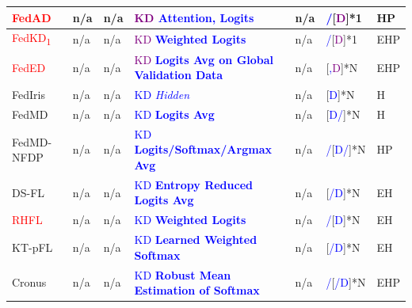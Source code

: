 \begin{table}[htp]
\begin{longtable}{|p{1.68cm}|p{1.2cm}|p{1.25cm}|p{5.0cm}|p{2.59cm}|p{1.2cm}|p{0.35cm}|}
    \rowcolor[gray]{.9}
    \textcolor{red}{FedAD}~\cite{gong2021ensemble} & n/a & n/a & \textcolor{purple}{KD} \textcolor{blue}{\textbf{Attention, Logits}}  & n/a & \textcolor{blue}{/}[\textcolor{purple}{D}]*1 & HP \\ \hline %
  
    \textcolor{red}{FedKD\textsubscript{1}}~\cite{gong2022preserving} & n/a & n/a & \textcolor{purple}{KD} \textcolor{blue}{\textbf{Weighted Logits}} & n/a &\textcolor{blue}{/}[\textcolor{purple}{D}]*1 & EHP \\ \hline %

    \rowcolor[gray]{.9}
    \textcolor{red}{FedED}~\cite{sui2020feded} & n/a & n/a & \textcolor{purple}{KD} \textcolor{blue}{\textbf{Logits Avg on Global Validation Data}} & n/a &[\textcolor{blue}{,}\textcolor{purple}{D}]*N & EHP \\ \hline %

    FedIris~\cite{luo2022fediris} & n/a & n/a & \textcolor{blue}{KD \textit{Hidden}} & n/a &[\textcolor{blue}{D}]*N & H \\ \hline %

    \rowcolor[gray]{.9}
    FedMD~\cite{li2019fedmd} & n/a & n/a & \textcolor{blue}{KD \textbf{Logits Avg}} & n/a &[\textcolor{blue}{D/}]*N & H \\ \hline %

    FedMD-NFDP~\cite{sun2020federated}& n/a & n/a & \textcolor{blue}{KD \textbf{Logits/Softmax/Argmax Avg}} & n/a & \textcolor{blue}{/}[\textcolor{blue}{D/}]*N & HP \\ \hline %

    \rowcolor[gray]{.9}
    DS-FL~\cite{itahara2021distillation}& n/a & n/a & \textcolor{blue}{KD \textbf{Entropy Reduced Logits Avg}} & n/a &[\textcolor{blue}{/D}]*N & EH \\ \hline %

    \textcolor{red}{RHFL}~\cite{fang2022robust} & n/a & n/a & \textcolor{blue}{KD \textbf{Weighted Logits}} & n/a & \textcolor{blue}{/}[\textcolor{blue}{D}]*N & EH \\ \hline

    \rowcolor[gray]{.9}
    KT-pFL~\cite{zhang2021parameterized} & n/a & n/a & \textcolor{blue}{KD \textbf{Learned Weighted Softmax}} & n/a &[\textcolor{blue}{/D}]*N & EH \\ \hline

    Cronus~\cite{chang2021cronus} & n/a & n/a & \textcolor{blue}{KD} \textcolor{blue}{\textbf{Robust Mean Estimation of Softmax}} & n/a & \textcolor{blue}{/}[\textcolor{blue}{/D}]*N & EHP \\ \hline
    

\end{longtable}
\end{table}

